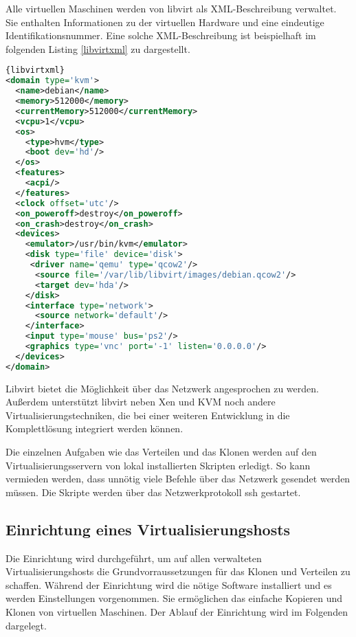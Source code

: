 Alle virtuellen Maschinen werden von libvirt als XML-Beschreibung verwaltet. Sie enthalten Informationen zu der virtuellen Hardware und eine eindeutige Identifikationsnummer. Eine solche XML-Beschreibung ist beispielhaft im folgenden Listing \ref{libvirtxml} zu dargestellt.
\\
\begin{lstlisting}[caption=libvirt-XML Beispiel,language=XML,label=libvirtxml]{libvirtxml}
<domain type='kvm'>
  <name>debian</name>
  <memory>512000</memory>
  <currentMemory>512000</currentMemory>
  <vcpu>1</vcpu>
  <os>
    <type>hvm</type>
    <boot dev='hd'/>
  </os>
  <features>
    <acpi/>
  </features>
  <clock offset='utc'/>
  <on_poweroff>destroy</on_poweroff>
  <on_crash>destroy</on_crash>
  <devices>
    <emulator>/usr/bin/kvm</emulator>
    <disk type='file' device='disk'>
     <driver name='qemu' type='qcow2'/>
      <source file='/var/lib/libvirt/images/debian.qcow2'/>
      <target dev='hda'/>
    </disk>
    <interface type='network'>
      <source network='default'/>
    </interface>
    <input type='mouse' bus='ps2'/>
    <graphics type='vnc' port='-1' listen='0.0.0.0'/>
  </devices>
</domain>
\end{lstlisting}

Libvirt bietet die Möglichkeit über das Netzwerk angesprochen zu werden. Außerdem unterstützt libvirt neben Xen und KVM noch andere Virtualisierungstechniken, die bei einer weiteren Entwicklung in die Komplettlösung integriert werden können. %

Die einzelnen Aufgaben wie das Verteilen und das Klonen werden auf den Virtualisierungsservern von lokal installierten Skripten erledigt. So kann vermieden werden, dass unnötig viele Befehle über das Netzwerk gesendet werden müssen. Die Skripte werden über das Netzwerkprotokoll ssh gestartet.


\subsection{Einrichtung eines Virtualisierungshosts}\label{einrichtung}
Die Einrichtung wird durchgeführt, um auf allen verwalteten Virtualisierungshosts die Grundvorraussetzungen für das Klonen und Verteilen zu schaffen. Während der Einrichtung wird die nötige Software installiert und es werden Einstellungen vorgenommen. Sie ermöglichen das einfache Kopieren und Klonen von virtuellen Maschinen. Der Ablauf der Einrichtung wird im Folgenden dargelegt. 

